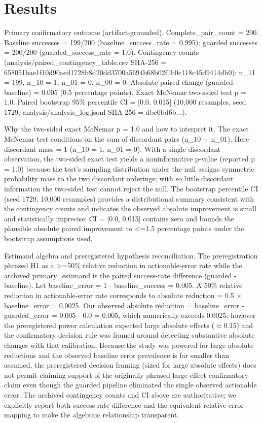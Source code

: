 \documentclass[conference]{IEEEtran}
\begin{document}
\section{Results}
Primary confirmatory outcome (artifact-grounded). Complete\_pair\_count = 200. Baseline successes = 199/200 (baseline\_success\_rate = 0.995); guarded successes = 200/200 (guarded\_success\_rate = 1.0). Contingency counts (analysis/paired\_contingency\_table.csv SHA-256 = 658051bae1f10d90aed1728b8d20dd3700a5694b68b02f1b0c118c45d9414db0): n\_11 = 199, n\_10 = 1, n\_01 = 0, n\_00 = 0. Absolute paired change (guarded - baseline) = 0.005 (0.5 percentage points). Exact McNemar two-sided test p = 1.0. Paired bootstrap 95\% percentile CI = [0.0, 0.015] (10,000 resamples, seed 1729; analysis/analysis\_log.jsonl SHA-256 = dbc0bd6b...).

Why the two-sided exact McNemar p = 1.0 and how to interpret it. The exact McNemar test conditions on the sum of discordant pairs (n\_10 + n\_01). Here discordant mass = 1 (n\_10 = 1, n\_01 = 0). With a single discordant observation, the two-sided exact test yields a noninformative p-value (reported p = 1.0) because the test's sampling distribution under the null assigns symmetric probability mass to the two discordant orderings; with so little discordant information the two-sided test cannot reject the null. The bootstrap percentile CI (seed 1729, 10,000 resamples) provides a distributional summary consistent with the contingency counts and indicates the observed absolute improvement is small and statistically imprecise: CI = [0.0, 0.015] contains zero and bounds the plausible absolute paired improvement to <=1.5 percentage points under the bootstrap assumptions used.

Estimand algebra and preregistered hypothesis reconciliation. The preregistration phrased H1 as a >=50\% relative reduction in actionable-error rate while the archived primary\_estimand is the paired success-rate difference (guarded - baseline). Let baseline\_error = 1 - baseline\_success = 0.005. A 50\% relative reduction in actionable-error rate corresponds to absolute reduction = 0.5 \ensuremath{\times} baseline\_error = 0.0025. Our observed absolute reduction = baseline\_error - guarded\_error = 0.005 - 0.0 = 0.005, which numerically exceeds 0.0025; however the preregistered power calculation expected large absolute effects (\ensuremath{\approx}0.15) and the confirmatory decision rule was framed around detecting substantive absolute changes with that calibration. Because the study was powered for large absolute reductions and the observed baseline error prevalence is far smaller than assumed, the preregistered decision framing (sized for large absolute effects) does not permit claiming support of the originally phrased large-effect confirmatory claim even though the guarded pipeline eliminated the single observed actionable error. The archived contingency counts and CI above are authoritative; we explicitly report both success-rate difference and the equivalent relative-error mapping to make the algebraic relationship transparent.
\end{document}

